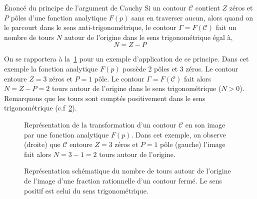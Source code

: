 \begin{theorem}{\'Enoncé du principe de l'argument de Cauchy
    } 
    Si un contour $\mathcal{C}$ contient $Z$ zéros et $P$ pôles d'une fonction 
    analytique $F(p)$ sans en traverser aucun, alors quand on le parcourt dans 
    le sens anti-trigonométrique, le contour $\Gamma=F(\mathcal{C})$ fait un 
    nombre de tours $N$ autour de l'origine dans le sens trigonométrique égal 
    à,
    \[ 
        N=Z-P
    \]
\end{theorem}

On se rapportera à la~\cref{fig-contour_cauchy} pour un exemple d'application 
de ce principe. Dans cet exemple la fonction analytique $F(p)$ possède 2 pôles 
et 3 zéros. Le contour entoure $Z=3$ zéros et $P=1$ pôle.
Le contour $\Gamma=F(\mathcal{C})$ fait alors $N=Z-P=2$ tours autour 
de l'origine dans le sens trigonométrique ($N>0$). Remarquons que les tours 
sont comptés positivement dans le sens trigonométrique (c.f~\cref{fig-ntours}).
\begin{figure}[!h]
    \centering
    
    \caption{Représentation de la transformation d'un contour $\mathcal{C}$ 
             en son image par une fonction analytique $F(p)$. Dans cet exemple,
             on observe (droite) que $\mathcal{C}$ entoure $Z=3$ zéros et 
             $P=1$ pôle (gauche) l'image fait alors $N=3-1=2$ tours autour de 
             l'origine.
    \label{fig-contour_cauchy}}
\end{figure}
\begin{figure}[!h]
    \centering
    
    
    

    
    
    
    \caption{Représentation schématique du nombre de tours autour de 
             l'origine de l'image d'une fraction rationnelle d'un contour 
             fermé. Le sens positif est celui du sens trigonométrique.
             \label{fig-ntours}}
\end{figure}
\clearpage
